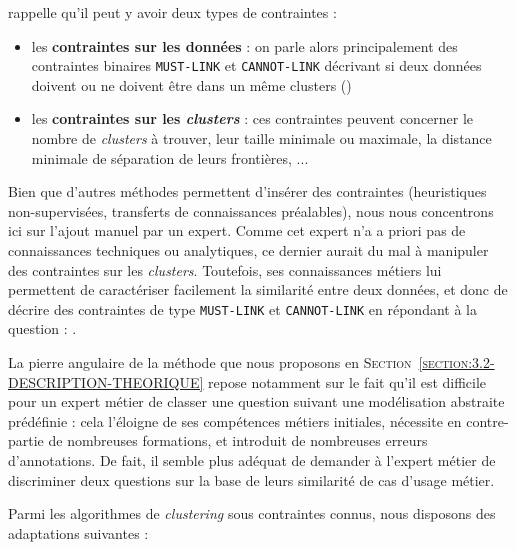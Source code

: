 		\cite{lampert-etal:2018:constrained-distance-based} rappelle qu'il peut y avoir deux types de contraintes :
		\begin{itemize}
			\item les \textbf{contraintes sur les données} : on parle alors principalement des contraintes binaires \texttt{MUST-LINK} et \texttt{CANNOT-LINK} décrivant si deux données doivent ou ne doivent être dans un même clusters (\cite{wagstaff-cardie:2000:clustering-instancelevel-constraints})
			\item les \textbf{contraintes sur les \textit{clusters}} : ces contraintes peuvent concerner le nombre de \textit{clusters} à trouver, leur taille minimale ou maximale, la distance minimale de séparation de leurs frontières, ...
		\end{itemize}
		
		Bien que d'autres méthodes permettent d'insérer des contraintes (heuristiques non-supervisées, transferts de connaissances préalables), nous nous concentrons ici sur l'ajout manuel par un expert.
		Comme cet expert n'a a priori pas de connaissances techniques ou analytiques, ce dernier aurait du mal à manipuler des contraintes sur les \textit{clusters}.
		Toutefois, ses connaissances métiers lui permettent de caractériser facilement la similarité entre deux données, et donc de décrire des contraintes de type \texttt{MUST-LINK} et \texttt{CANNOT-LINK} en répondant à la question : .
		
		\begin{leftBarAuthorOpinion}
			La pierre angulaire de la méthode que nous proposons en \textsc{Section~\ref{section:3.2-DESCRIPTION-THEORIQUE}} repose notamment sur le fait qu'il est difficile pour un expert métier de classer une question suivant une modélisation abstraite prédéfinie : cela l'éloigne de ses compétences métiers initiales, nécessite en contre-partie de nombreuses formations, et introduit de nombreuses erreurs d'annotations.
			De fait, il semble plus adéquat de demander à l'expert métier de discriminer deux questions sur la base de leurs similarité de cas d'usage métier.
		\end{leftBarAuthorOpinion}
		
		
		Parmi les algorithmes de \textit{clustering} sous contraintes connus, nous disposons des adaptations suivantes :
		
